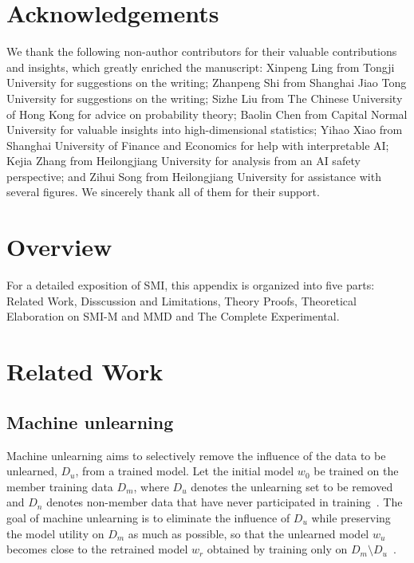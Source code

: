 \documentclass{article}
\theoremstyle{plain}
\theoremstyle{definition}
\theoremstyle{remark}
\begin{document}
\section*{Acknowledgements}
We thank the following non-author contributors for their valuable contributions and insights, which greatly enriched the manuscript: Xinpeng Ling from Tongji University for suggestions on the writing; Zhanpeng Shi from Shanghai Jiao Tong University for suggestions on the writing; Sizhe Liu from The Chinese University of Hong Kong for advice on probability theory; Baolin Chen from Capital Normal University for valuable insights into high-dimensional statistics; Yihao Xiao from Shanghai University of Finance and Economics for help with interpretable AI; Kejia Zhang from Heilongjiang University for analysis from an AI safety perspective; and Zihui Song from Heilongjiang University for assistance with several figures. We sincerely thank all of them for their support.










\clearpage
\appendix

\section*{Overview}
For a detailed exposition of SMI, this appendix is organized into five parts: Related Work, Disscussion and Limitations, Theory Proofs,  Theoretical Elaboration on SMI-M and MMD and The Complete Experimental.
\section{Related Work}
\subsection{Machine unlearning}
Machine unlearning aims to selectively remove the influence of the data to be unlearned, $D_u$, from a trained model. Let the initial model $w_0$ be trained on the member training data $D_m$, where $D_u$ denotes the unlearning set to be removed and $D_n$ denotes non-member data that have never participated in training~\cite{unlearningicml2}. The goal of machine unlearning is to eliminate the influence of $D_u$ while preserving the model utility on $D_m$ as much as possible, so that the unlearned model $w_u$ becomes close to the retrained model $w_r$ obtained by training only on $D_m\setminus D_u$~\cite{unlearningN,unlearningS,Yisafty}.
\end{document}
